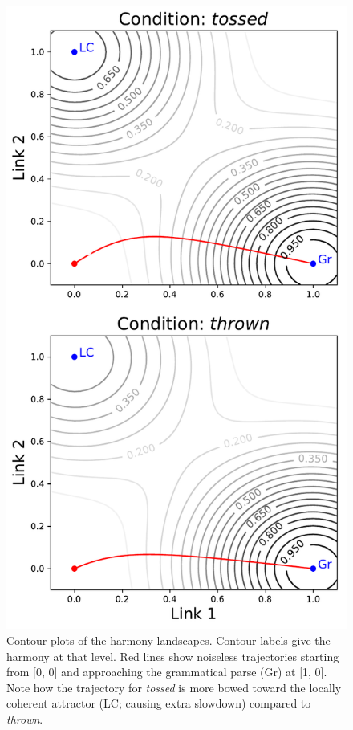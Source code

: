 \documentclass[10pt,letterpaper]{article}
\begin{document}
\begin{figure}[h!]
\includegraphics[width=0.8\linewidth]{../Model/HarmonyContours.pdf}
\centering
\caption{Contour plots of the harmony landscapes. Contour labels give the harmony at that level. Red lines show noiseless trajectories starting from [0, 0] and approaching the grammatical parse (Gr) at [1, 0]. Note how the trajectory for \emph{tossed} is more bowed toward the locally coherent attractor (LC; causing extra slowdown) compared to \emph{thrown}.}
\label{harmonylandscape}
\end{figure}
\end{document}
